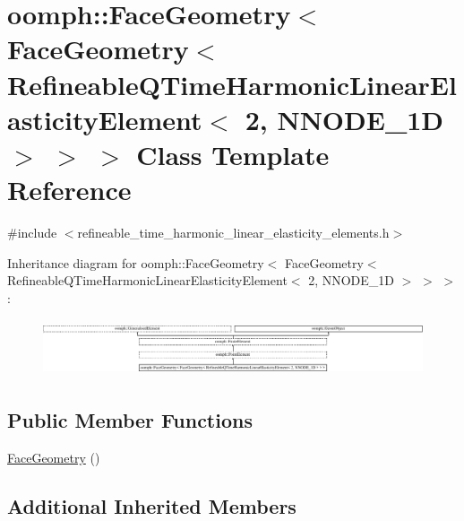 \hypertarget{classoomph_1_1FaceGeometry_3_01FaceGeometry_3_01RefineableQTimeHarmonicLinearElasticityElement_30dd001f9853903c36c2fd45bbf5d07b1}{}\section{oomph\+:\+:Face\+Geometry$<$ Face\+Geometry$<$ Refineable\+Q\+Time\+Harmonic\+Linear\+Elasticity\+Element$<$ 2, N\+N\+O\+D\+E\+\_\+1D $>$ $>$ $>$ Class Template Reference}
\label{classoomph_1_1FaceGeometry_3_01FaceGeometry_3_01RefineableQTimeHarmonicLinearElasticityElement_30dd001f9853903c36c2fd45bbf5d07b1}


{\ttfamily \#include $<$refineable\+\_\+time\+\_\+harmonic\+\_\+linear\+\_\+elasticity\+\_\+elements.\+h$>$}

Inheritance diagram for oomph\+:\+:Face\+Geometry$<$ Face\+Geometry$<$ Refineable\+Q\+Time\+Harmonic\+Linear\+Elasticity\+Element$<$ 2, N\+N\+O\+D\+E\+\_\+1D $>$ $>$ $>$\+:\begin{figure}[H]
\begin{center}
\leavevmode
\includegraphics[height=1.684211cm]{classoomph_1_1FaceGeometry_3_01FaceGeometry_3_01RefineableQTimeHarmonicLinearElasticityElement_30dd001f9853903c36c2fd45bbf5d07b1}
\end{center}
\end{figure}
\subsection*{Public Member Functions}
\begin{DoxyCompactItemize}
\item 
\hyperlink{classoomph_1_1FaceGeometry_3_01FaceGeometry_3_01RefineableQTimeHarmonicLinearElasticityElement_30dd001f9853903c36c2fd45bbf5d07b1_a7fe13602752eb37aacf55c21912186cc}{Face\+Geometry} ()
\end{DoxyCompactItemize}
\subsection*{Additional Inherited Members}


